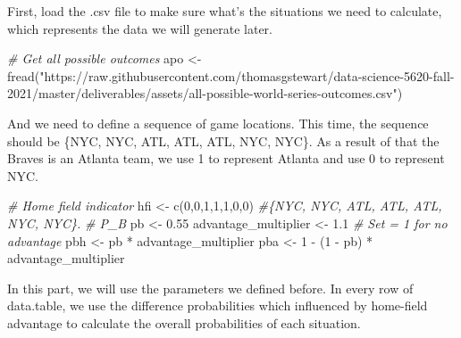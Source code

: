 \documentclass[
]{article}
\newenvironment{Shaded}{\begin{snugshade}}{\end{snugshade}}
\newcommand{\CommentTok}[1]{\textcolor[rgb]{0.56,0.35,0.01}{\textit{#1}}}
\newcommand{\DecValTok}[1]{\textcolor[rgb]{0.00,0.00,0.81}{#1}}
\newcommand{\FloatTok}[1]{\textcolor[rgb]{0.00,0.00,0.81}{#1}}
\newcommand{\FunctionTok}[1]{\textcolor[rgb]{0.00,0.00,0.00}{#1}}
\newcommand{\NormalTok}[1]{#1}
\newcommand{\OtherTok}[1]{\textcolor[rgb]{0.56,0.35,0.01}{#1}}
\newcommand{\SpecialCharTok}[1]{\textcolor[rgb]{0.00,0.00,0.00}{#1}}
\newcommand{\StringTok}[1]{\textcolor[rgb]{0.31,0.60,0.02}{#1}}
\begin{document}
First, load the .csv file to make sure what's the situations we need to
calculate, which represents the data we will generate later.

\begin{Shaded}
\begin{Highlighting}[]
\CommentTok{\# Get all possible outcomes}
\NormalTok{apo }\OtherTok{\textless{}{-}} \FunctionTok{fread}\NormalTok{(}\StringTok{"https://raw.githubusercontent.com/thomasgstewart/data{-}science{-}5620{-}fall{-}2021/master/deliverables/assets/all{-}possible{-}world{-}series{-}outcomes.csv"}\NormalTok{)}
\end{Highlighting}
\end{Shaded}

And we need to define a sequence of game locations. This time, the
sequence should be \{NYC, NYC, ATL, ATL, ATL, NYC, NYC\}. As a result of
that the Braves is an Atlanta team, we use 1 to represent Atlanta and
use 0 to represent NYC.

\begin{Shaded}
\begin{Highlighting}[]
\CommentTok{\# Home field indicator}
\NormalTok{hfi }\OtherTok{\textless{}{-}} \FunctionTok{c}\NormalTok{(}\DecValTok{0}\NormalTok{,}\DecValTok{0}\NormalTok{,}\DecValTok{1}\NormalTok{,}\DecValTok{1}\NormalTok{,}\DecValTok{1}\NormalTok{,}\DecValTok{0}\NormalTok{,}\DecValTok{0}\NormalTok{) }\CommentTok{\#\{NYC, NYC, ATL, ATL, ATL, NYC, NYC\}. }
\CommentTok{\# P\_B}
\NormalTok{pb }\OtherTok{\textless{}{-}} \FloatTok{0.55}
\NormalTok{advantage\_multiplier }\OtherTok{\textless{}{-}} \FloatTok{1.1} \CommentTok{\# Set = 1 for no advantage}
\NormalTok{pbh }\OtherTok{\textless{}{-}}\NormalTok{ pb }\SpecialCharTok{*}\NormalTok{ advantage\_multiplier}
\NormalTok{pba }\OtherTok{\textless{}{-}} \DecValTok{1} \SpecialCharTok{{-}}\NormalTok{ (}\DecValTok{1} \SpecialCharTok{{-}}\NormalTok{ pb) }\SpecialCharTok{*}\NormalTok{ advantage\_multiplier}
\end{Highlighting}
\end{Shaded}

In this part, we will use the parameters we defined before. In every row
of data.table, we use the difference probabilities which influenced by
home-field advantage to calculate the overall probabilities of each
situation.
\end{document}
